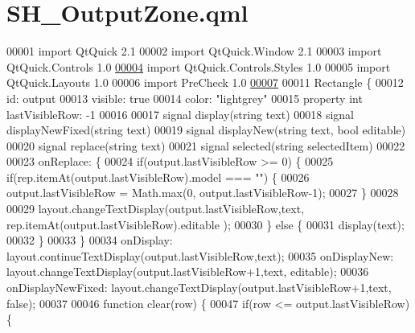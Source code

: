 \hypertarget{SH__OutputZone_8qml}{\section{S\-H\-\_\-\-Output\-Zone.\-qml}
\label{SH__OutputZone_8qml}
}

\begin{DoxyCode}
00001 \textcolor{keyword}{import} QtQuick 2.1
00002 import QtQuick.Window 2.1
00003 import QtQuick.Controls 1.0
\hypertarget{SH__OutputZone_8qml_source_l00004}{}\hyperlink{classSH__OutputZone}{00004} import QtQuick.Controls.Styles 1.0
00005 import QtQuick.Layouts 1.0
00006 import PreCheck 1.0
\hypertarget{SH__OutputZone_8qml_source_l00007}{}\hyperlink{classSH__OutputZone_ae324bcdd20ad4a9e435678d045964dc9}{00007} 
00011 Rectangle \{
00012     \textcolor{keywordtype}{id}: output
00013     visible: \textcolor{keyword}{true}
00014     color: \textcolor{stringliteral}{"lightgrey"}
00015     \textcolor{keyword}{property} \textcolor{keywordtype}{int} lastVisibleRow: -1
00016 
00017     signal display(\textcolor{keywordtype}{string} text)
00018     signal displayNewFixed(\textcolor{keywordtype}{string} text)
00019     signal displayNew(\textcolor{keywordtype}{string} text, \textcolor{keywordtype}{bool} editable)
00020     signal replace(\textcolor{keywordtype}{string} text)
00021     signal selected(\textcolor{keywordtype}{string} selectedItem)
00022 
00023     onReplace: \{
00024         \textcolor{keywordflow}{if}(output.lastVisibleRow >= 0) \{
00025             \textcolor{keywordflow}{if}(rep.itemAt(output.lastVisibleRow).model === \textcolor{stringliteral}{""}) \{
00026                 output.lastVisibleRow = Math.max(0, output.lastVisibleRow-1);
00027             \}
00028 
00029             layout.changeTextDisplay(output.lastVisibleRow,text, rep.itemAt(output.lastVisibleRow).editable
      );
00030         \} \textcolor{keywordflow}{else} \{
00031             display(text);
00032         \}
00033     \}
00034     onDisplay: layout.continueTextDisplay(output.lastVisibleRow,text);
00035     onDisplayNew: layout.changeTextDisplay(output.lastVisibleRow+1,text, editable);
00036     onDisplayNewFixed: layout.changeTextDisplay(output.lastVisibleRow+1,text, \textcolor{keyword}{false});
00037 
00046     \textcolor{keyword}{function} clear(row) \{
00047         \textcolor{keywordflow}{if}(row <= output.lastVisibleRow) \{

\end{DoxyCode}
